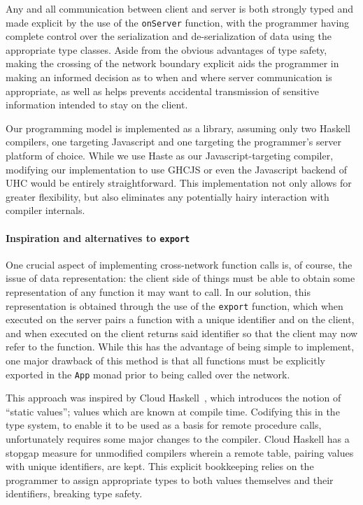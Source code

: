 \documentclass[preprint]{sigplanconf}
\begin{document}
Any and all communication between client and server is both strongly typed
and made explicit by the use of the \lstinline!onServer! function, with the
programmer having complete control over the serialization and de-serialization
of data using the appropriate type classes. Aside from the obvious advantages
of type safety, making the crossing of the network boundary explicit aids the
programmer in making an informed decision as to when and where server
communication is appropriate, as well as helps prevents accidental transmission
of sensitive information intended to stay on the client.

Our programming model is implemented as a library, assuming only two Haskell
compilers, one targeting Javascript and one targeting the programmer's server
platform of choice. While we use Haste as our Javascript-targeting compiler,
modifying our implementation to use GHCJS or even the Javascript backend of UHC
would be entirely straightforward. This implementation not only allows for
greater flexibility, but also eliminates any potentially hairy interaction with
compiler internals.

\paragraph{Inspiration and alternatives to \lstinline!export!} One crucial
aspect of implementing cross-network function calls is, of course, the issue of
data representation: the client side of things must be able to obtain some
representation of any function it may want to call. In our solution, this
representation is obtained through the use of the \lstinline!export! function,
which when executed on the server pairs a function with a unique identifier and
on the client, and when executed on the client returns said identifier so that
the client may now refer to the function. While this has the advantage of being
simple to implement, one major drawback of this method is that all functions
must be explicitly exported in the \lstinline!App! monad prior to being called
over the network.

This approach was inspired by Cloud Haskell\ \cite{cloudhaskell}, which
introduces the notion of ``static values''; values which are known at compile
time. Codifying this in the type system, to enable it to be used as a basis for
remote procedure calls, unfortunately requires some major changes to the
compiler. Cloud Haskell has a stopgap measure for unmodified compilers wherein
a remote table, pairing values with unique identifiers, are kept. This explicit
bookkeeping relies on the programmer to assign appropriate types to both values
themselves and their identifiers, breaking type safety.
\end{document}
